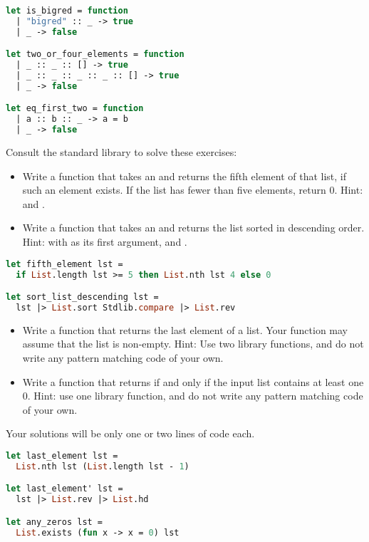 \begin{lstlisting}[language=Caml]
let is_bigred = function
  | "bigred" :: _ -> true
  | _ -> false

let two_or_four_elements = function
  | _ :: _ :: [] -> true
  | _ :: _ :: _ :: _ :: [] -> true
  | _ -> false

let eq_first_two = function
  | a :: b :: _ -> a = b
  | _ -> false
\end{lstlisting}

\problem[library]
Consult the  standard library to solve these exercises:
\begin{itemize}
	\item Write a function that takes an  and returns the fifth element of that list, if such an element exists. If the list has fewer than five elements, return 0. Hint:  and .
	\item Write a function that takes an  and returns the list sorted in descending order. Hint:  with  as its first argument, and .
\end{itemize}

\begin{lstlisting}[language=OCaml]
let fifth_element lst =
  if List.length lst >= 5 then List.nth lst 4 else 0

let sort_list_descending lst = 
  lst |> List.sort Stdlib.compare |> List.rev
\end{lstlisting}

\begin{itemize}
	\item Write a function that returns the last element of a list. Your function may assume that the list is non-empty. Hint: Use two library functions, and do not write any pattern matching code of your own.
	\item Write a function  that returns  if and only if the input list contains at least one 0. Hint: use one library function, and do not write any pattern matching code of your own.
\end{itemize}
Your solutions will be only one or two lines of code each.

\begin{lstlisting}[language=OCaml]
let last_element lst = 
  List.nth lst (List.length lst - 1)

let last_element' lst = 
  lst |> List.rev |> List.hd

let any_zeros lst = 
  List.exists (fun x -> x = 0) lst
\end{lstlisting}

